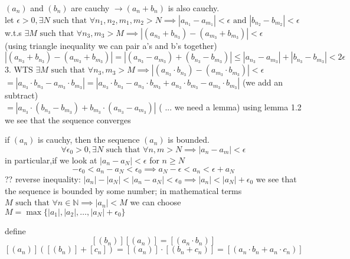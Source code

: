 \documentclass{article}
\begin{document}
\begin{proofbox}[proof of 2, 3]
    $(a_n)$ and $(b_n)$ are cauchy $\rightarrow (a_n + b_n)$ is also cauchy. \\
    let $\epsilon > 0, \exists N \text{ such that } \forall n_1, n_2, m_1, m_2 > N \implies |a_{n_1}  - a_{m_1}| < \epsilon    \text{ and } |b_{n_2} - b_{m_2}| < \epsilon$ \\

    w.t.s $\exists M \text{ such that } \forall n_3, m_3 > M \implies |(a_{n_3} + b_{n_3}) - (a_{m_3} + b_{m_3})| < \epsilon$ \\ (using triangle inequality we can pair a's and b's together) \\
    $|(a_{n_3} + b_{n_3}) - (a_{m_3} + b_{m_3})| = |(a_{n_3} - a_{m_3}) + (b_{n_3} - b_{m_3})| \leq |a_{n_3} - a_{m_3}| + |b_{n_3} - b_{m_3}| < 2\epsilon$ \\

    
    3. WTS $\exists M \text{ such that } \forall n_3, m_3 > M \implies |(a_{n_3} \cdot b_{n_3}) - (a_{m_3} \cdot b_{m_3})| < \epsilon$ \\
    $ = |a_{n_3} \cdot b_{n_3} - a_{m_3} \cdot b_{m_3}| = |a_{n_3} \cdot b_{n_3} - a_{n_3} \cdot b_{m_3} + a_{n_3} \cdot b_{m_3} - a_{m_3} \cdot b_{m_3}|$  (we add an subtract) \\
    $ = |a_{n_3} \cdot (b_{n_3} - b_{m_3}) + b_{m_3} \cdot (a_{n_3} - a_{m_3})| $      \hspace{30pt} ( ... we need a lemma) using lemma 1.2 we see that the sequence converges 

\end{proofbox}
\begin{lemma}
    if $(a_n)$ is cauchy, then the sequence $(a_n)$ is bounded. 
    $$\forall \epsilon_0 > 0, \exists N \text{ such that } \forall n, m  > N \implies |a_n - a_m| < \epsilon$$ 
    in particular,if we look at $|a_n - a_N | < \epsilon$ for $n \geq N$ $$-\epsilon_0 < a_n - a_N < \epsilon_0 \implies a_N - \epsilon < a_n < \epsilon + a_N$$ 
?? reverse inequality: $|a_n| - |a_N| < |a_n - a_N| < \epsilon_0 \implies |a_n| < |a_N| + \epsilon_0$ we see that the sequence is bounded by some number; in mathematical terms $M \text{ such that } \forall n \in \mathbb{N} \implies |a_n| < M$ we can choose $M = \max\{|a_1|, |a_2|, \dots, |a_N| + \epsilon_0\}$ 
\end{lemma}
\begin{definition}
    define $$[(b_n)][(a_n)] = [(a_n \cdot b_n)]$$ 
    $$[(a_n)]([(b_n)] + [c_n]) = [(a_n)] \cdot [(b_n + c_n)] = [(a_n \cdot b_n + a_n \cdot c_n)]$$ 

\end{definition}
\end{document}
